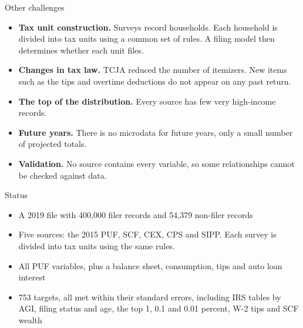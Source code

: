 \documentclass[11pt,aspectratio=169]{beamer}
\begin{document}
\begin{frame}{Other challenges}
  \begin{itemize}
    \item \textbf{Tax unit construction.} Surveys record households. Each household is divided into
          tax units using a common set of rules. A filing model then determines whether each unit files.
    \vspace{0.5em}
    \item \textbf{Changes in tax law.} TCJA reduced the number of itemizers. New items such as the
          tips and overtime deductions do not appear on any past return.
    \vspace{0.5em}
    \item \textbf{The top of the distribution.} Every source has few very high-income records.
    \vspace{0.5em}
    \item \textbf{Future years.} There is no microdata for future years, only a small number of projected totals.
    \vspace{0.5em}
    \item \textbf{Validation.} No source contains every variable, so some relationships cannot be
          checked against data.
  \end{itemize}
\end{frame}


\begin{frame}{Status}
  \begin{itemize}
    \item A 2019 file with 400,000 filer records and 54,379 non-filer records
    \vspace{0.4em}
    \item Five sources: the 2015 PUF, SCF, CEX, CPS and SIPP. Each survey is divided into tax units
          using the same rules.
    \vspace{0.4em}
    \item All PUF variables, plus a balance sheet, consumption, tips and auto loan interest
    \vspace{0.4em}
    \item 753 targets, all met within their standard errors, including IRS tables by AGI, filing
          status and age, the top 1, 0.1 and 0.01 percent, W-2 tips and SCF wealth
  \end{itemize}
\end{frame}
\end{document}
